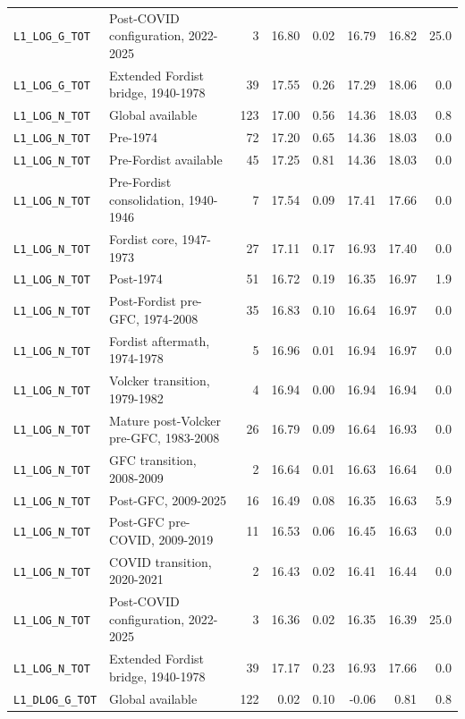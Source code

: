 \begin{landscape}
\begin{longtable}{p{4.4cm}p{3.8cm}rrrrrr}
\\
\nolinkurl{L1_LOG_G_TOT} & Post-COVID configuration, 2022-2025 & 3 & 16.80 & 0.02 & 16.79 & 16.82 & 25.0
\\
\nolinkurl{L1_LOG_G_TOT} & Extended Fordist bridge, 1940-1978 & 39 & 17.55 & 0.26 & 17.29 & 18.06 & 0.0
\\
\nolinkurl{L1_LOG_N_TOT} & Global available & 123 & 17.00 & 0.56 & 14.36 & 18.03 & 0.8
\\
\nolinkurl{L1_LOG_N_TOT} & Pre-1974 & 72 & 17.20 & 0.65 & 14.36 & 18.03 & 0.0
\\
\nolinkurl{L1_LOG_N_TOT} & Pre-Fordist available & 45 & 17.25 & 0.81 & 14.36 & 18.03 & 0.0
\\
\nolinkurl{L1_LOG_N_TOT} & Pre-Fordist consolidation, 1940-1946 & 7 & 17.54 & 0.09 & 17.41 & 17.66 & 0.0
\\
\nolinkurl{L1_LOG_N_TOT} & Fordist core, 1947-1973 & 27 & 17.11 & 0.17 & 16.93 & 17.40 & 0.0
\\
\nolinkurl{L1_LOG_N_TOT} & Post-1974 & 51 & 16.72 & 0.19 & 16.35 & 16.97 & 1.9
\\
\nolinkurl{L1_LOG_N_TOT} & Post-Fordist pre-GFC, 1974-2008 & 35 & 16.83 & 0.10 & 16.64 & 16.97 & 0.0
\\
\nolinkurl{L1_LOG_N_TOT} & Fordist aftermath, 1974-1978 & 5 & 16.96 & 0.01 & 16.94 & 16.97 & 0.0
\\
\nolinkurl{L1_LOG_N_TOT} & Volcker transition, 1979-1982 & 4 & 16.94 & 0.00 & 16.94 & 16.94 & 0.0
\\
\nolinkurl{L1_LOG_N_TOT} & Mature post-Volcker pre-GFC, 1983-2008 & 26 & 16.79 & 0.09 & 16.64 & 16.93 & 0.0
\\
\nolinkurl{L1_LOG_N_TOT} & GFC transition, 2008-2009 & 2 & 16.64 & 0.01 & 16.63 & 16.64 & 0.0
\\
\nolinkurl{L1_LOG_N_TOT} & Post-GFC, 2009-2025 & 16 & 16.49 & 0.08 & 16.35 & 16.63 & 5.9
\\
\nolinkurl{L1_LOG_N_TOT} & Post-GFC pre-COVID, 2009-2019 & 11 & 16.53 & 0.06 & 16.45 & 16.63 & 0.0
\\
\nolinkurl{L1_LOG_N_TOT} & COVID transition, 2020-2021 & 2 & 16.43 & 0.02 & 16.41 & 16.44 & 0.0
\\
\nolinkurl{L1_LOG_N_TOT} & Post-COVID configuration, 2022-2025 & 3 & 16.36 & 0.02 & 16.35 & 16.39 & 25.0
\\
\nolinkurl{L1_LOG_N_TOT} & Extended Fordist bridge, 1940-1978 & 39 & 17.17 & 0.23 & 16.93 & 17.66 & 0.0
\\
\nolinkurl{L1_DLOG_G_TOT} & Global available & 122 & 0.02 & 0.10 & -0.06 & 0.81 & 0.8

\end{longtable}
\end{landscape}
